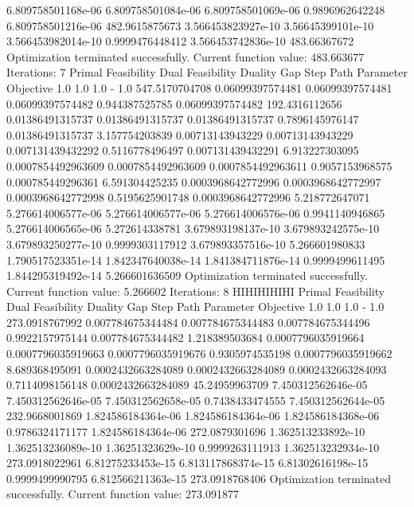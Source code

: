\documentclass[letterpaper,10pt,english]{sphinxmanual}
\begin{document}
{\begin{sphinxVerbatim}[commandchars=\\\{\}]
6.809758501168e-06  6.809758501084e-06  6.809758501069e-06  0.9896962642248  6.809758501216e-06  482.9615875673
3.566453823927e-10  3.56645399101e-10   3.566453982014e-10  0.9999476448412  3.566453742836e-10  483.66367672
Optimization terminated successfully.
         Current function value: 483.663677
         Iterations: 7
Primal Feasibility  Dual Feasibility    Duality Gap         Step             Path Parameter      Objective
1.0                 1.0                 1.0                 -                1.0                 547.5170704708
0.06099397574481    0.06099397574481    0.06099397574482    0.944387525785   0.06099397574482    192.4316112656
0.01386491315737    0.01386491315737    0.01386491315737    0.7896145976147  0.01386491315737    3.157754203839
0.00713143943229    0.00713143943229    0.007131439432292   0.5116778496497  0.007131439432291   6.913227303095
0.0007854492963609  0.0007854492963609  0.0007854492963611  0.9057153968575  0.000785449296361   6.591304425235
0.0003968642772996  0.0003968642772997  0.0003968642772998  0.5195625901748  0.0003968642772996  5.218772647071
5.276614006577e-06  5.276614006577e-06  5.276614006576e-06  0.9941140946865  5.276614006565e-06  5.272614338781
3.679893198137e-10  3.679893242575e-10  3.679893250277e-10  0.9999303117912  3.679893357516e-10  5.266601980833
1.790517523351e-14  1.842347640038e-14  1.841384711876e-14  0.9999499611495  1.844295319492e-14  5.266601636509
Optimization terminated successfully.
         Current function value: 5.266602
         Iterations: 8
HIHIHIHIHI
Primal Feasibility  Dual Feasibility    Duality Gap         Step             Path Parameter      Objective
1.0                 1.0                 1.0                 -                1.0                 273.0918767992
0.007784675344484   0.007784675344483   0.007784675344496   0.9922157975144  0.007784675344482   1.218389503684
0.0007796035919664  0.0007796035919663  0.0007796035919676  0.9305974535198  0.0007796035919662  8.689368495091
0.0002432663284089  0.0002432663284089  0.0002432663284093  0.7114098156148  0.0002432663284089  45.24959963709
7.450312562646e-05  7.450312562646e-05  7.450312562658e-05  0.7438433474555  7.450312562644e-05  232.9668001869
1.824586184364e-06  1.824586184364e-06  1.824586184368e-06  0.9786324171177  1.824586184364e-06  272.0879301696
1.362513233892e-10  1.362513236089e-10  1.36251323629e-10   0.9999263111913  1.362513232934e-10  273.0918022961
6.81275233453e-15   6.813117868374e-15  6.81302616198e-15   0.9999499990795  6.812566211363e-15  273.0918768406
Optimization terminated successfully.
         Current function value: 273.091877

\end{sphinxVerbatim}}
\end{document}
